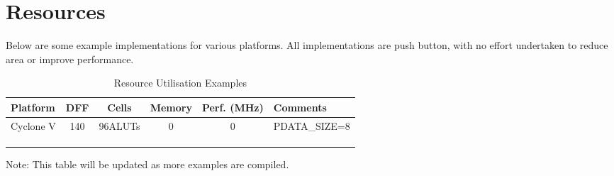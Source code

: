 \chapter{Resources}

Below are some example implementations for various platforms. All implementations are push button, with no effort undertaken to reduce area or improve performance.
\setlength\LTleft{0pt}
\setlength\LTright{0pt}

\begin{longtable}[]{@{\extracolsep{\fill}}lccccl@{}}
	\toprule
		\textbf{Platform} & \textbf{DFF} & \textbf{Cells} &
		\textbf{Memory} & \textbf{Perf. (MHz)} & \textbf{Comments} \tabularnewline
	\midrule
	\endhead
	 Cyclone V & 140  & 96ALUTs & 0 & 0 & PDATA\_SIZE=8\tabularnewline
		& & & & &\tabularnewline
		& & & & &\tabularnewline
	\bottomrule
	\caption{Resource Utilisation Examples}
	\label{tab:RESOURCES}
\end{longtable}

Note: This table will be updated as more examples are compiled.
